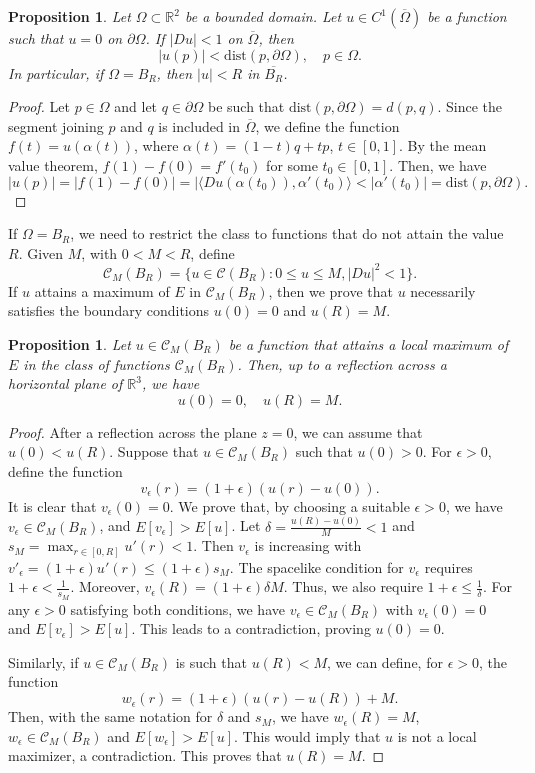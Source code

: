 \documentclass[a4paper,12pt]{amsart}
\newtheorem{proposition}[theorem]{Proposition}
\theoremstyle{definition}
\def\r{\mathbb R}
\begin{document}
\begin{proposition} 
Let $\Omega\subset\r^2$ be a bounded domain. Let $u\in C^1(\overline{\Omega})$ be a function such that $u=0$ on $\partial\Omega$. If $|Du|<1$ on $\overline{\Omega}$, then 
$$|u(p)|<\mbox{dist}(p,\partial\Omega),\quad p\in\Omega.$$
In particular, if $\Omega=B_R$, then $|u|< R$ in $\overline{B_R}$.
\end{proposition}

\begin{proof}
Let $p\in\Omega$ and  let $q\in\partial\Omega$ be such that $\mbox{dist}(p,\partial\Omega)=d(p,q)$. Since the segment joining $p$ and $q$ is included in $\overline{\Omega}$, we define the function $f(t)=u(\alpha(t))$, where $\alpha(t)=(1-t)q+tp$, $t\in [0,1]$. By the mean value theorem, $f(1)-f(0)=f'(t_0)$ for some $t_0\in[0,1]$. Then, we have 
$$|u(p)|=|f(1)-f(0)|=|\langle Du(\alpha(t_0)),\alpha'(t_0)\rangle<|\alpha'(t_0)|=\mbox{dist}(p,\partial\Omega).$$
\end{proof}

If $\Omega=B_R$, we need to  restrict the class to functions that do not attain the value $R$.  Given $M$, with $0<M<R$, define 
$$\mathcal{C}_M(B_R)=\{u\in \mathcal{C}(B_R)\colon   0\leq u\leq M, |Du|^2<1\}.$$
If $u$ attains a maximum of $E$ in $\mathcal{C}_M(B_R)$, then we prove that $u$ necessarily satisfies the boundary conditions $u(0)=0$ and $u(R)=M$. 

\begin{proposition} Let $u\in \mathcal{C}_M(B_R)$ be a function that attains a local maximum of $E$ in the class of functions $\mathcal{C}_M(B_R)$. Then, up to a reflection across a horizontal plane of $\r^3$, we have 
$$u(0)=0,\quad u(R)=M.$$
\end{proposition}

\begin{proof}
After a reflection across the plane $z=0$,  we can assume that $u(0)<u(R)$. Suppose that $u\in \mathcal{C}_M(B_R)$ such that $u(0)>0$. For $\epsilon>0$, define  the function 
$$v_\epsilon(r)=(1+\epsilon )(u(r)-u(0)).$$
It is clear that $v_\epsilon(0)=0$. We prove that, by choosing a suitable $\epsilon>0$, we have $v_\epsilon\in \mathcal{C}_M(B_R)$,  and 
$E[v_\epsilon]>E[u]$. Let $\delta=\frac{u(R)-u(0)}{M}<1$ and $s_M=\max_{r\in [0,R]}u'(r)<1$. Then $v_\epsilon$ is increasing with $v'_\epsilon=(1+\epsilon)u'(r)\leq (1+\epsilon)s_M$. The spacelike condition for $v_\epsilon$ requires $1+\epsilon<\frac{1}{s_M}$. Moreover, $v_\epsilon(R)=(1+\epsilon)\delta M$. Thus, we also require $1+\epsilon\leq \frac{1}{\delta}$. For any $\epsilon>0$ satisfying both conditions, we have $v_\epsilon\in \mathcal{C}_M(B_R)$ with $v_\epsilon(0)=0$ and 
$E[v_\epsilon]>E[u]$. This leads to a contradiction, proving $u(0)=0$.

Similarly, if $u\in \mathcal{C}_M(B_R)$ is such that $u(R)<M$, we can define, for $\epsilon>0$, the function 
$$w_\epsilon(r)=(1+\epsilon)(u(r)-u(R))+M.$$
Then, with the same notation for $\delta$ and $s_M$, we have $w_\epsilon(R)=M$, $w_\epsilon\in \mathcal{C}_M(B_R)$ and $E[w_\epsilon]>E[u]$. This would imply that $u$ is not a local maximizer, a contradiction. This proves that $u(R)=M$.
\end{proof}
\end{document}
